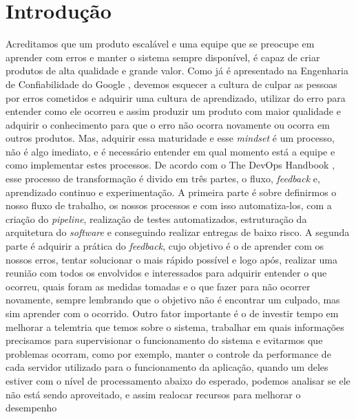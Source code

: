 \chapter{Introdução}

  Acreditamos que um produto escalável e uma equipe que se preocupe em aprender
  com erros e manter o sistema sempre disponível, é capaz de criar produtos de
  alta qualidade e grande valor. \newline
  Como já é apresentado na Engenharia de Confiabilidade do Google
  \cite{SiteReliabilityEngineering}, devemos esquecer a cultura de culpar as
  pessoas por erros cometidos e adquirir uma cultura de aprendizado, utilizar do
  erro para entender como ele ocorreu e assim produzir um produto com maior
  qualidade e adquirir o conhecimento para que o erro não ocorra novamente ou
  ocorra em outros produtos. Mas, adquirir essa maturidade e esse \textit{mindset}
  é um processo, não é algo imediato, e é necessário entender em qual momento
  está a equipe e como implementar estes processos. \newline
  De acordo com o The DevOps Handbook \cite{TheDevOpsHandbook},
  esse processo de transformação é divido em três partes, o fluxo, \textit{feedback}
  e, aprendizado continuo e experimentação. A primeira parte é sobre definirmos
  o nosso fluxo de trabalho, os nossos processos e com isso automatiza-los, com
  a criação do \textit{pipeline}, realização de testes automatizados, estruturação
  da arquitetura do \textit{software} e conseguindo realizar entregas de baixo
  risco. A segunda parte é adquirir a prática do \textit{feedback}, cujo objetivo
  é o de aprender com os nossos erros, tentar solucionar o mais rápido possível e
  logo após, realizar uma reunião com todos os envolvidos e interessados para
  adquirir entender o que ocorreu, quais foram as medidas tomadas e o que fazer
  para não ocorrer novamente, sempre lembrando que o objetivo não é encontrar um
  culpado, mas sim aprender com o ocorrido. Outro fator importante é o de
  investir tempo em melhorar a telemtria que temos sobre o sistema, trabalhar em
  quais informações precisamos para supervisionar o funcionamento do sistema e
  evitarmos que problemas ocorram, como por exemplo, manter o controle da performance
  de cada servidor utilizado para o funcionamento da aplicação, quando um deles
  estiver com o nível de processamento abaixo do esperado, podemos analisar se ele
  não está sendo aproveitado, e assim realocar recursos para melhorar o desempenho
